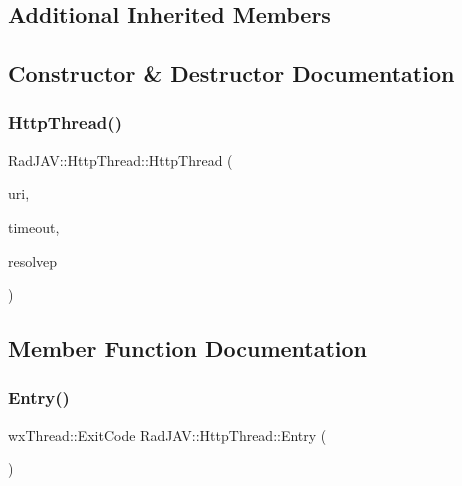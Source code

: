\subsection*{Additional Inherited Members}


\subsection{Constructor \& Destructor Documentation}
\mbox{\label{class_rad_j_a_v_1_1_http_thread_ac5bc26360698d376783e61f5359275e2}} 
\subsubsection{\texorpdfstring{Http\+Thread()}{HttpThread()}}
{\footnotesize\ttfamily Rad\+J\+A\+V\+::\+Http\+Thread\+::\+Http\+Thread (\begin{DoxyParamCaption}\item[{\mbox{\hyperlink{class_rad_j_a_v_1_1_string}{String}}}]{uri,  }\item[{R\+J\+L\+O\+NG}]{timeout,  }\item[{v8\+::\+Persistent$<$ v8\+::\+Function $>$ $\ast$}]{resolvep }\end{DoxyParamCaption})}



\subsection{Member Function Documentation}
\mbox{\label{class_rad_j_a_v_1_1_http_thread_a4c3a9d372fa7ad736918d361df6af681}} 
\subsubsection{\texorpdfstring{Entry()}{Entry()}}
{\footnotesize\ttfamily wx\+Thread\+::\+Exit\+Code Rad\+J\+A\+V\+::\+Http\+Thread\+::\+Entry (\begin{DoxyParamCaption}{ }\end{DoxyParamCaption})}



